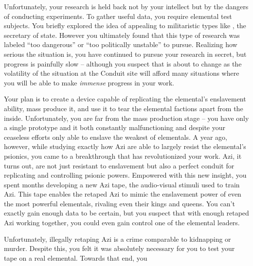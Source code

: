 \documentclass[char]{elementals}
\begin{document}
Unfortunately, your research is held back not by your intellect but by the dangers of conducting experiments. To gather useful data, you require elemental test subjects. You briefly explored the idea of appealing to militaristic types like \cDema{\intro}, the secretary of state. However you ultimately found that this type of research was labeled ``too dangerous'' or ``too politically unstable'' to pursue. Realizing how serious the situation is, you have continued to pursue your research in secret, but progress is painfully slow -- although you suspect that is about to change as the volatility of the situation at the Conduit site will afford many situations where you will be able to make \emph{immense} progress in your work.

Your plan is to create a device capable of replicating the elemental's enslavement ability, mass produce it, and use it to tear the elemental factions apart from the inside. Unfortunately, you are far from the mass production stage -- you have only a single prototype and it both constantly malfunctioning and despite your ceaseless efforts only able to enslave the weakest of elementals. A year ago, however, while studying exactly how Azi are able to largely resist the elemental's psionics, you came to a breakthrough that has revolutionized your work. Azi, it turns out, are not just resistant to enslavement but also a perfect conduit for replicating and controlling psionic powers. Empowered with this new insight, you spent months developing a new Azi tape, the audio-visual stimuli used to train Azi. This tape enables the retaped Azi to mimic the enslavement power of even the most powerful elementals, rivaling even their kings and queens. You can't exactly gain enough data to be certain, but you suspect that with enough retaped Azi working together, you could even gain control one of the elemental leaders.

Unfortunately, illegally retaping Azi is a crime comparable to kidnapping or murder. Despite this, you felt it was absolutely necessary for you to test your tape on a real elemental. Towards that end, you 
\end{document}
